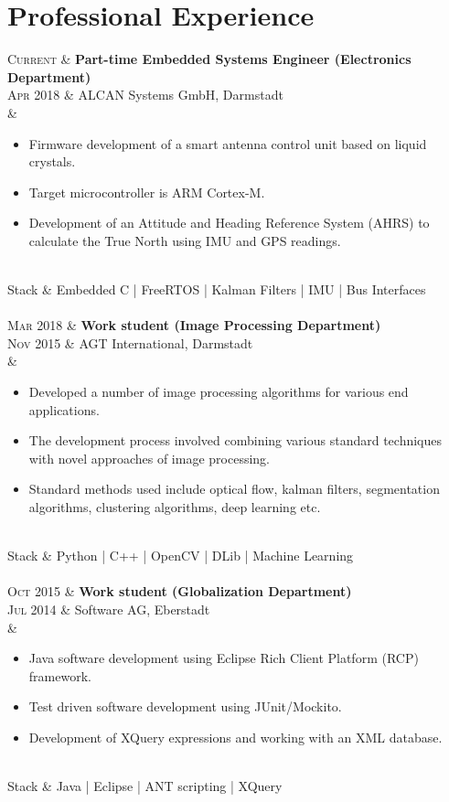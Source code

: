 \documentclass[a4paper,10pt]{article}
\makeatletter
\newcommand*{\bulletfontstyle}[1]{\fontsize{8.5pt}{1em}\selectfont\color{mycustom} #1}
\newcommand{\addexperience}[8]{%
\textsc{#1} & \textbf{#3 (#6)}\\%
\textsc{#2} & #4, #5\\
& \begin{minipage}{0.84\textwidth}
\begin{itemize}%
\bulletfontstyle{#7}%
\end{itemize}
\end{minipage}\\%
\bulletfontstyle{Stack} & \bulletfontstyle{#8}\\%
}
\newenvironment{mainevn}{%
\vspace{2mm}
\tabularx{\linewidth}{>{\raggedleft\arraybackslash\hsize=0.25\hsize}X@{\hspace{2mm}}|@{\hspace{1mm}}>{\hsize=1.75\hsize}X}}
{\endtabularx\vspace{8mm}}
\makeatother
\begin{document}
\begin{minipage}[c]{0.67\textwidth}
\section{Professional Experience}
\begin{mainevn}
\addexperience{Current}{Apr 2018}{Part-time Embedded Systems Engineer}{ALCAN Systems GmbH}{Darmstadt}%
{Electronics Department}%
{%
\item Firmware development of a smart antenna control unit based on liquid crystals.
\item Target microcontroller is ARM Cortex-M.
\item Development of an Attitude and Heading Reference System (AHRS) to calculate the True North using IMU and GPS readings.%
}{Embedded C | FreeRTOS | Kalman Filters | IMU | Bus Interfaces}%
\\
%
%
%
\addexperience{Mar 2018}{Nov 2015}{Work student}{AGT International}{Darmstadt}%
{Image Processing Department}%
{%
\item Developed a number of image processing algorithms for various end applications.
\item The development process involved combining various standard techniques with novel approaches of image processing.
\item Standard methods used include optical flow, kalman filters, segmentation algorithms, clustering algorithms, deep learning etc.
}{Python | C++ | OpenCV | DLib | Machine Learning}
\\
%
%
%
\addexperience{Oct 2015}{Jul 2014}{Work student}{Software AG}{Eberstadt}%
{Globalization Department}{%
\item Java software development using Eclipse Rich Client Platform (RCP) framework. 
\item Test driven software development using JUnit/Mockito.
\item Development of XQuery expressions and working with an XML database.%
}{Java | Eclipse | ANT scripting | XQuery}
\end{mainevn}


\end{minipage}
\end{document}

